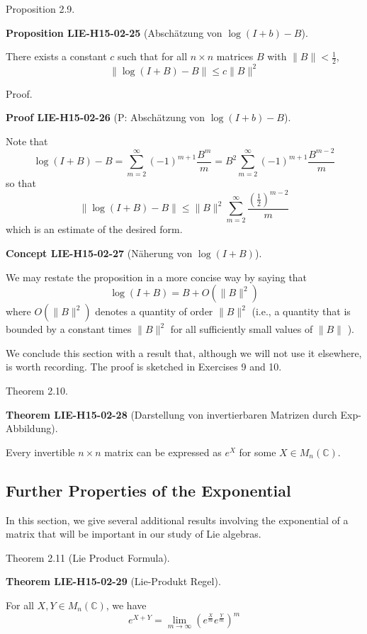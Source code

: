 \documentclass[10pt, letterpaper]{article}
\newcommand{\CustomHeading}[3]{%
  \par\medskip\noindent%
  \textbf{#1 #2} \textnormal{(#3)}.\enskip%
}
\newenvironment{PROP}[2]{\begin{unitbox}\CustomHeading{Proposition}{#1}{#2}}{\end{unitbox}}
\newenvironment{THEO}[2]{\begin{unitbox}\CustomHeading{Theorem}{#1}{#2}}{\end{unitbox}}
\newenvironment{CONC}[2]{\begin{unitbox}\CustomHeading{Concept}{#1}{#2}}{\end{unitbox}}
\newenvironment{PROOF}[2]{\begin{unitbox}\CustomHeading{Proof}{#1}{#2}}{\end{unitbox}}
\begin{document}
Proposition 2.9. 


\begin{PROP}{LIE-H15-02-25}{Abschätzung von $\log (I+b)-B$}
There exists a constant $c$ such that for all $n \times n$ matrices $B$ with $\|B\|<\frac{1}{2}$,
$$
\|\log (I+B)-B\| \leq c\|B\|^{2}
$$
\end{PROP}

Proof. 

\begin{PROOF}{LIE-H15-02-26}{P: Abschätzung von $\log (I+b)-B$}
Note that
$$
\log (I+B)-B=\sum_{m=2}^{\infty}(-1)^{m+1} \frac{B^{m}}{m}=B^{2} \sum_{m=2}^{\infty}(-1)^{m+1} \frac{B^{m-2}}{m}
$$
so that
$$
\|\log (I+B)-B\| \leq\|B\|^{2} \sum_{m=2}^{\infty} \frac{\left(\frac{1}{2}\right)^{m-2}}{m}
$$
which is an estimate of the desired form.
\end{PROOF}


\begin{CONC}{LIE-H15-02-27}{Näherung von $\log (I+B)$}
We may restate the proposition in a more concise way by saying that
$$
\log (I+B)=B+O\left(\|B\|^{2}\right)
$$
where $O\left(\|B\|^{2}\right)$ denotes a quantity of order $\|B\|^{2}$ (i.e., a quantity that is bounded by a constant times $\|B\|^{2}$ for all sufficiently small values of $\|B\|$ ).
\end{CONC}

We conclude this section with a result that, although we will not use it elsewhere, is worth recording. The proof is sketched in Exercises 9 and 10.


Theorem 2.10. 


\begin{THEO}{LIE-H15-02-28}{Darstellung von invertierbaren Matrizen durch Exp-Abbildung}
Every invertible $n \times n$ matrix can be expressed as $e^{X}$ for some $X \in M_{n}(\mathbb{C})$.
\end{THEO}



\subsection*{Further Properties of the Exponential}


In this section, we give several additional results involving the exponential of a matrix that will be important in our study of Lie algebras.

Theorem 2.11 (Lie Product Formula). 


\begin{THEO}{LIE-H15-02-29}{Lie-Produkt Regel}
For all $X, Y \in M_{n}(\mathbb{C})$, we have
$$
e^{X+Y}=\lim _{m \rightarrow \infty}\left(e^{\frac{X}{m}} e^{\frac{Y}{m}}\right)^{m}
$$
\end{THEO}
\end{document}
